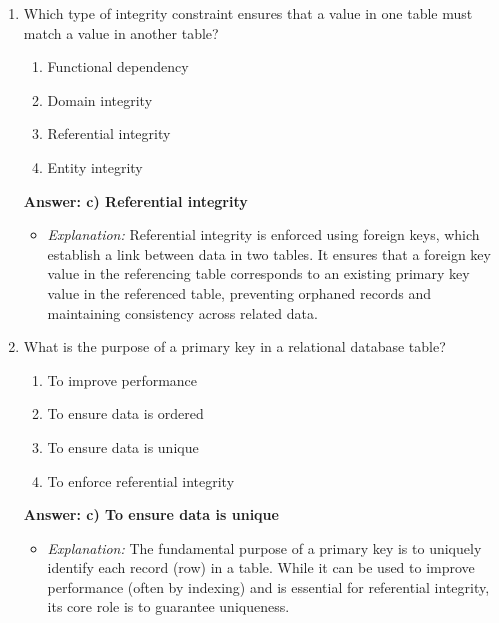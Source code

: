 \documentclass{article}
\begin{document}
\begin{enumerate}[label=\textbf{Question \arabic*.}]
    \item Which type of integrity constraint ensures that a value in one table must match a value in another table?
        \begin{enumerate}[label=\alph*)]
            \item Functional dependency
            \item Domain integrity
            \item Referential integrity
            \item Entity integrity
        \end{enumerate}
        \textbf{Answer: c) Referential integrity}
        \begin{itemize}
            \item \textit{Explanation:} Referential integrity is enforced using foreign keys, which establish a link between data in two tables. It ensures that a foreign key value in the referencing table corresponds to an existing primary key value in the referenced table, preventing orphaned records and maintaining consistency across related data.
        \end{itemize}
    
    \item What is the purpose of a primary key in a relational database table?
        \begin{enumerate}[label=\alph*)]
            \item To improve performance
            \item To ensure data is ordered
            \item To ensure data is unique
            \item To enforce referential integrity
        \end{enumerate}
        \textbf{Answer: c) To ensure data is unique}
        \begin{itemize}
            \item \textit{Explanation:} The fundamental purpose of a primary key is to uniquely identify each record (row) in a table. While it can be used to improve performance (often by indexing) and is essential for referential integrity, its core role is to guarantee uniqueness.
        \end{itemize}
    

\end{enumerate}
\end{document}
